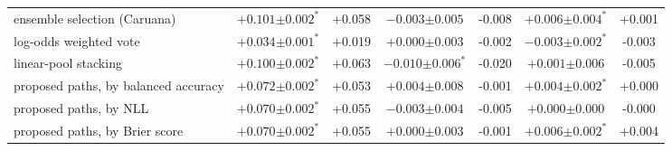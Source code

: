 \begin{table}[t]
\begin{adjustbox}{max width=\linewidth}
\begin{tabular}{lcccccc}
ensemble selection (Caruana) & $+0.101{\scriptstyle\pm0.002}^{\ast}$ & +0.058 & $-0.003{\scriptstyle\pm0.005}$ & -0.008 & $+0.006{\scriptstyle\pm0.004}^{\ast}$ & +0.001 \\
log-odds weighted vote & $+0.034{\scriptstyle\pm0.001}^{\ast}$ & +0.019 & $+0.000{\scriptstyle\pm0.003}$ & -0.002 & $-0.003{\scriptstyle\pm0.002}^{\ast}$ & -0.003 \\
linear-pool stacking & $+0.100{\scriptstyle\pm0.002}^{\ast}$ & +0.063 & $-0.010{\scriptstyle\pm0.006}^{\ast}$ & -0.020 & $+0.001{\scriptstyle\pm0.006}$ & -0.005 \\
\addlinespace
proposed paths, by balanced accuracy & $+0.072{\scriptstyle\pm0.002}^{\ast}$ & +0.053 & $+0.004{\scriptstyle\pm0.008}$ & -0.001 & $+0.004{\scriptstyle\pm0.002}^{\ast}$ & +0.000 \\
proposed paths, by NLL & $+0.070{\scriptstyle\pm0.002}^{\ast}$ & +0.055 & $-0.003{\scriptstyle\pm0.004}$ & -0.005 & $+0.000{\scriptstyle\pm0.000}$ & -0.000 \\
proposed paths, by Brier score & $+0.070{\scriptstyle\pm0.002}^{\ast}$ & +0.055 & $+0.000{\scriptstyle\pm0.003}$ & -0.001 & $+0.006{\scriptstyle\pm0.002}^{\ast}$ & +0.004 \\
\bottomrule
\end{tabular}
\end{adjustbox}
\end{table}
